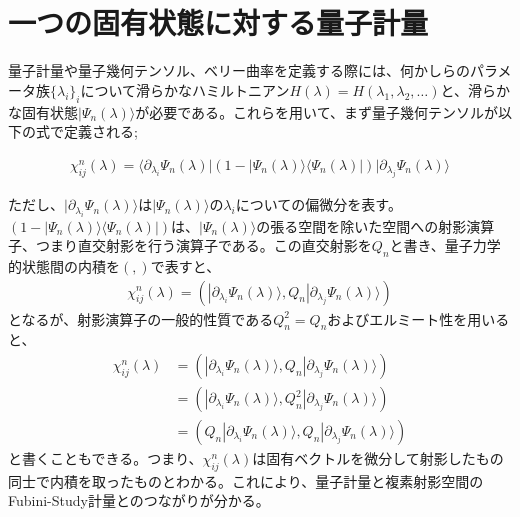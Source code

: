 \documentclass[12pt]{jsbook}
\newcommand{\la}{\langle}
\newcommand{\ra}{\rangle}
\newcommand{\pa}{\partial}
\begin{document}
\section{一つの固有状態に対する量子計量}
量子計量や量子幾何テンソル、ベリー曲率を定義する際には、何かしらのパラメータ族$\{\lambda_i\}_i$について滑らかなハミルトニアン$H(\lambda)=H(\lambda_1,\lambda_2,\ldots)$と、滑らかな固有状態$|\Psi_n(\lambda)\ra$が必要である\cite{Resta2011}。これらを用いて、まず量子幾何テンソルが以下の式で定義される;

\begin{eqnarray}
\label{def_single_QGT}
\chi^{n}_{ij}(\lambda)=\la \pa_{\lambda_i} \Psi_n(\lambda)|(1-|\Psi_n(\lambda)\ra\la\Psi_n(\lambda)|)|\pa_{\lambda_j}\Psi_n(\lambda)\ra 
\end{eqnarray}

ただし、$|\pa_{\lambda_i}\Psi_n(\lambda)\ra $は$|\Psi_n(\lambda)\ra$の$\lambda_i$についての偏微分を表す。$(1-|\Psi_n(\lambda)\ra\la\Psi_n(\lambda)|)$は、$|\Psi_n(\lambda)\ra$の張る空間を除いた空間への射影演算子、つまり直交射影を行う演算子である。この直交射影を$Q_n$と書き、量子力学的状態間の内積を$(,)$で表すと、
\begin{eqnarray}
\chi^{n}_{ij}(\lambda)=(|\pa_{\lambda_i}\Psi_n(\lambda)\ra,Q_n|\pa_{\lambda_j}\Psi_n(\lambda)\ra)
\end{eqnarray}
となるが、射影演算子の一般的性質である$Q_n^2=Q_n$およびエルミート性を用いると、
\begin{eqnarray}
\chi^{n}_{ij}(\lambda)&=(|\pa_{\lambda_i}\Psi_n(\lambda)\ra,Q_n|\pa_{\lambda_j}\Psi_n(\lambda)\ra)\\
&=(|\pa_{\lambda_i}\Psi_n(\lambda)\ra,Q_n^2|\pa_{\lambda_j}\Psi_n(\lambda)\ra)\\
&=(Q_n|\pa_{\lambda_i}\Psi_n(\lambda)\ra,Q_n|\pa_{\lambda_j}\Psi_n(\lambda)\ra)
\end{eqnarray}
と書くこともできる。つまり、$\chi^{n}_{ij}(\lambda)$は固有ベクトルを微分して射影したもの同士で内積を取ったものとわかる。これにより、量子計量と複素射影空間のFubini-Study計量\cite{nakahara2018geometry}とのつながりが分かる。
\end{document}
